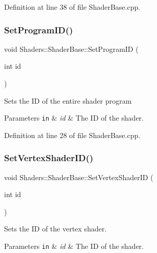 Definition at line 38 of file Shader\+Base.\+cpp.

\mbox{\label{class_shaders_1_1_shader_base_a25f6a1f85f7f3094f6019971239ad2ce}} 
\subsubsection{\texorpdfstring{Set\+Program\+I\+D()}{SetProgramID()}}
{\footnotesize\ttfamily void Shaders\+::\+Shader\+Base\+::\+Set\+Program\+ID (\begin{DoxyParamCaption}\item[{int}]{id }\end{DoxyParamCaption})}

Sets the ID of the entire shader program 
\begin{DoxyParams}[1]{Parameters}
\mbox{\tt in}  & {\em id} & The ID of the shader. \\
\hline
\end{DoxyParams}


Definition at line 28 of file Shader\+Base.\+cpp.

\mbox{\label{class_shaders_1_1_shader_base_afb186a683a560e325c3e5fe6f60d6c59}} 
\subsubsection{\texorpdfstring{Set\+Vertex\+Shader\+I\+D()}{SetVertexShaderID()}}
{\footnotesize\ttfamily void Shaders\+::\+Shader\+Base\+::\+Set\+Vertex\+Shader\+ID (\begin{DoxyParamCaption}\item[{int}]{id }\end{DoxyParamCaption})}

Sets the ID of the vertex shader. 
\begin{DoxyParams}[1]{Parameters}
\mbox{\tt in}  & {\em id} & The ID of the shader. \\
\hline
\end{DoxyParams}


